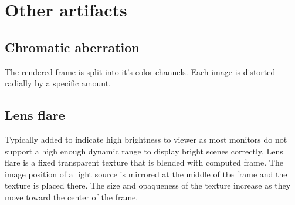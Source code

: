 \chapter{Other artifacts}
\section{Chromatic aberration}
\label{ch:Content2:sec:Section1}
The rendered frame is split into it's color channels.
Each image is distorted radially by a specific amount.

\section{Lens flare}
\label{ch:Content2:sec:Section2}
Typically added to indicate high brightness to viewer as most monitors do not support a high enough dynamic range to display bright scenes correctly.
Lens flare is a fixed transparent texture that is blended with computed frame.
The image position of a light source is mirrored at the middle of the frame and the texture is placed there.
The size and opaqueness of the texture increase as they move toward the center of the frame.